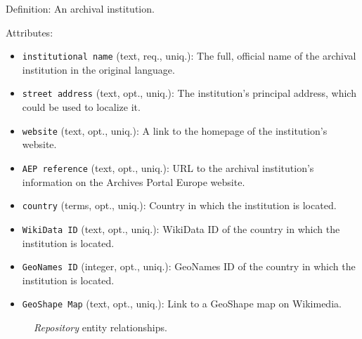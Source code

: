 Definition: An archival institution.

\vspace{1em}
\noindent Attributes:

\begin{itemize}
    \item \texttt{institutional name} (text, req., uniq.): The full, official name of the archival institution in the original language.
    \item \texttt{street address} (text, opt., uniq.): The institution's principal address, which could be used to localize it.
    \item \texttt{website} (text, opt., uniq.): A link to the homepage of the institution's website.
    \item \texttt{AEP reference}  (text, opt., uniq.): URL to the archival institution's information on the Archives Portal Europe website.
    \item \texttt{country} (terms, opt., uniq.): Country in which the institution is located.
    \item \texttt{WikiData ID} (text, opt., uniq.): WikiData ID of the country in which the institution is located.
    \item \texttt{GeoNames ID} (integer, opt., uniq.): GeoNames ID of the country in which the institution is located.
    \item \texttt{GeoShape Map} (text, opt., uniq.): Link to a GeoShape map on Wikimedia.
\end{itemize}

\begin{figure}[ht]
    \begin{center}
        
    \end{center}
\label{fig:RepositoryER}
\caption{\textit{Repository} entity relationships.}
\end{figure}

